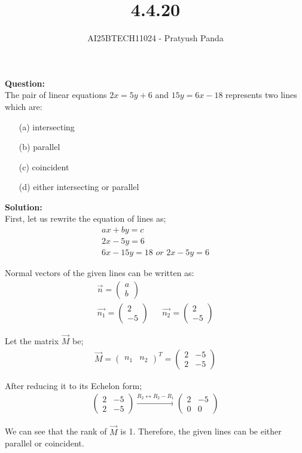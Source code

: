 \documentclass{beamer}
\title{4.4.20}
\author{AI25BTECH11024 - Pratyush Panda}
\theoremstyle{remark}
\newcommand{\myvec}[1]{\ensuremath{\begin{pmatrix}#1\end{pmatrix}}}
\numberwithin{equation}{section}
\begin{document}
\maketitle

\begin{frame}
\textbf{Question: } \\
The pair of linear equations $2x=5y+6$ and $15y=6x-18$ represents two lines which are: 
\begin{enumerate}
\item[(a)] intersecting
\item[(b)] parallel
\item[(c)] coincident
\item[(d)] either intersecting or parallel
\end{enumerate}
\end{frame}


\begin{frame}
\textbf{Solution: } \\
First, let us rewrite the equation of lines as;
\begin{align}
ax+by=c \\
2x-5y=6 \\
6x-15y=18 \textit{ or } 2x-5y=6
\end{align}

Normal vectors of the given lines can be written as:
\begin{align}
\Vec{n}=\myvec{a \\ b} \\
\Vec{n_1}=\myvec{2 \\ -5} && \Vec{n_2}=\myvec{2 \\ -5}
\end{align}
\end{frame}

\begin{frame}
Let the matrix $\Vec{M}$ be;
\begin{align}
\Vec{M}=\myvec{n_1 & n_2}^T=\myvec{2 & -5 \\ 2 & -5}
\end{align}

After reducing it to its Echelon form;
\begin{align}
\myvec{2 & -5 \\ 2 & -5}\xrightarrow{R_2\longleftrightarrow R_2-R_1}\myvec{2 & -5 \\ 0 & 0}
\end{align}

We can see that the rank of $\Vec{M}$ is 1. Therefore, the given lines can be either parallel or coincident.
\end{frame}
\end{document}
